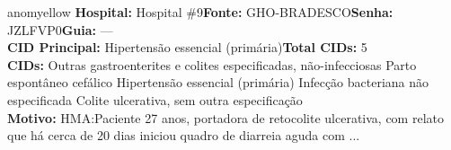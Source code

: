 \documentclass[a4paper,10pt]{article}
\begin{document}
\begin{anomalycard}[Interna\c{c}\~{a}o \#118873 | Pac. \#98593 | MODERADO (z=2.11) | LOS: 27d | 24/02/2026\,$\to$\,—]{anomyellow}
\textbf{Hospital:} Hospital \#9\quad \textbf{Fonte:} GHO-BRADESCO\quad \textbf{Senha:} JZLFVP0\quad \textbf{Guia:} ---\\

\textbf{CID Principal:} {\small Hipertensão essencial (primária)}\quad\textbf{Total CIDs:} 5\\

\textbf{CIDs:} {\scriptsize Outras gastroenterites e colites especificadas, não-infecciosas \textbar{} Parto espontâneo cefálico \textbar{} Hipertensão essencial (primária) \textbar{} Infecção bacteriana não especificada \textbar{} Colite ulcerativa, sem outra especificação}\\

\textbf{Motivo:} {\scriptsize HMA:Paciente 27 anos, portadora de retocolite ulcerativa, com relato que há cerca de 20 dias iniciou quadro de diarreia aguda com ...}\\



\end{anomalycard}
\end{document}
